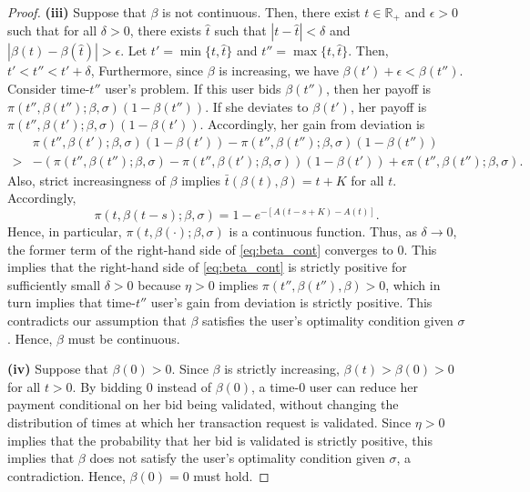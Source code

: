 \documentclass[12pt, letterpaper]{article}
\begin{document}
\begin{proof}
\textbf{(iii)} Suppose that $\beta$ is not continuous. Then, there exist $t \in \mathbb{R}_+$ and $\epsilon > 0$ such that for all $\delta > 0$, there exists $\hat{t}$ such that $|t - \hat{t}| < \delta$ and $|\beta(t) - \beta(\hat{t})| > \epsilon$.
Let $t' = \min\{t, \hat{t}\}$ and $t'' = \max\{t, \hat{t}\}$. Then, $t' < t'' < t'+\delta$, Furthermore, since $\beta$ is increasing, we have $\beta(t') + \epsilon < \beta(t'')$. Consider time-$t''$ user's problem. If this user bids $\beta(t'')$, then her payoff is $\pi(t'', \beta(t''); \beta, \sigma) (1 - \beta(t''))$. If she deviates to $\beta(t')$, her payoff is $\pi(t'', \beta(t'); \beta, \sigma)(1 - \beta(t'))$. Accordingly, her gain from deviation is
\begin{align}\label{eq:beta_cont}
    & \pi(t'', \beta(t'); \beta, \sigma)(1 - \beta(t')) - \pi(t'', \beta(t''); \beta, \sigma)(1 - \beta(t''))\\
    >& -(\pi(t'', \beta(t''); \beta, \sigma) - \pi(t'', \beta(t'); \beta, \sigma))(1 - \beta(t')) + \epsilon \pi(t'', \beta(t''); \beta, \sigma).
\end{align}
Also, strict increasingness of $\beta$  implies $\bar{t}(\beta(t), \beta) = t + K$ for all $t$. Accordingly,
\begin{equation}
    \pi(t, \beta(t - s); \beta, \sigma) = 1 - e^{-[A(t - s + K) - A(t)]}.
\end{equation}
Hence, in particular, $\pi(t, \beta(\cdot); \beta, \sigma)$ is a continuous  function. Thus, as $\delta \to 0$, the former term of the right-hand side of \eqref{eq:beta_cont} converges to $0$.
This implies that the right-hand side of \eqref{eq:beta_cont} is strictly positive for sufficiently small $\delta>0$ because $\eta>0$ implies $\pi(t'', \beta(t''), \beta)>0$, which in turn implies that
time-$t''$ user's gain from deviation is strictly positive. This contradicts our assumption that $\beta$ satisfies the user's optimality condition given $\sigma$. Hence, $\beta$ must be continuous.

\textbf{(iv)} Suppose that $\beta(0) > 0$. Since $\beta$ is strictly increasing, $\beta(t) > \beta(0) > 0$ for all $t > 0$. By bidding $0$ instead of $\beta(0)$, a time-$0$ user can reduce her payment conditional on her bid being validated, without changing the distribution of times at which her transaction request is validated. Since $\eta>0$ implies that the probability that her bid is validated is strictly positive, this implies that $\beta$ does not satisfy the user's optimality condition given $\sigma$, a contradiction. Hence, $\beta(0)=0$ must hold.


\end{proof}
\end{document}
